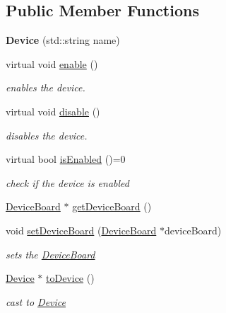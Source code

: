 \subsection*{Public Member Functions}
\begin{DoxyCompactItemize}
\item 
\hypertarget{classdrobot_1_1device_1_1Device_ab55bd66f79422bd251ea5f94e80ba036}{{\bfseries Device} (std\-::string name)}\label{classdrobot_1_1device_1_1Device_ab55bd66f79422bd251ea5f94e80ba036}

\item 
virtual void \hyperlink{classdrobot_1_1device_1_1Device_a0c28785ff2e79f99b8e9eaefe6749f2b}{enable} ()
\begin{DoxyCompactList}\small\item\em enables the device. \end{DoxyCompactList}\item 
virtual void \hyperlink{classdrobot_1_1device_1_1Device_a289499673ae30bd72101c68fbd04cd89}{disable} ()
\begin{DoxyCompactList}\small\item\em disables the device. \end{DoxyCompactList}\item 
virtual bool \hyperlink{classdrobot_1_1device_1_1Device_aa5b7eac8638d0d2d5ee9bf10607b100e}{is\-Enabled} ()=0
\begin{DoxyCompactList}\small\item\em check if the device is enabled \end{DoxyCompactList}\item 
\hyperlink{classdrobot_1_1device_1_1DeviceBoard}{Device\-Board} $\ast$ \hyperlink{classdrobot_1_1device_1_1Device_abb2094b9cb9a794eb9c8c9798b37a376}{get\-Device\-Board} ()
\item 
void \hyperlink{classdrobot_1_1device_1_1Device_a60464a906ee599de5d4368a373a368d3}{set\-Device\-Board} (\hyperlink{classdrobot_1_1device_1_1DeviceBoard}{Device\-Board} $\ast$device\-Board)
\begin{DoxyCompactList}\small\item\em sets the \hyperlink{classdrobot_1_1device_1_1DeviceBoard}{Device\-Board} \end{DoxyCompactList}\item 
\hyperlink{classdrobot_1_1device_1_1Device}{Device} $\ast$ \hyperlink{classdrobot_1_1device_1_1Device_a2ad010960f753e0299afae8c89708d34}{to\-Device} ()
\begin{DoxyCompactList}\small\item\em cast to \hyperlink{classdrobot_1_1device_1_1Device}{Device} \end{DoxyCompactList}\item 

\end{DoxyCompactItemize}
